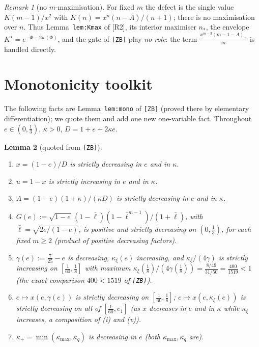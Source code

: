 \documentclass[11pt]{article}
\newtheorem{lemma}{Lemma}[section]
\theoremstyle{remark}
\newtheorem{remark}[lemma]{Remark}
\newcommand{\kxi}{\kappa_\xi}
\newcommand{\kq}{\kappa_q}
\newcommand{\kmx}{\kappa_{\max}}
\newcommand{\khi}{\kappa_{+}}
\newcommand{\lbar}{\bar\ell}
\newcommand{\RII}{[R2]}
\begin{document}
\begin{remark}[no $m$-maximisation]\label{zb9:rmk:noKmax}
For fixed $m$ the defect is the single value $K(m-1)/x^2$ with
$K(n)=x^n(n-A)/(n+1)$; there is no maximisation over $n$.  Thus
Lemma~\texttt{lem:Kmax} of \RII, its interior maximiser $n_*$, the envelope
$K^\star=e^{-\Phi-2w(\Phi)}$, and the gate of \texttt{[ZB]} play \emph{no
role}: the term $\tfrac{x^{m-3}(m-1-A)_+}{m}$ is handled directly.
\end{remark}

\section{Monotonicity toolkit}\label{zb9:sec:mono}

The following facts are Lemma~\texttt{lem:mono} of \texttt{[ZB]} (proved
there by elementary differentiation); we quote them and add one new
one-variable fact.  Throughout $e\in(0,\tfrac13)$, $\kappa>0$, $D=1+e+2\kappa e$.

\begin{lemma}[quoted from \texttt{[ZB]}]\label{zb9:mono}
\begin{enumerate}[label=\textup{(\roman*)},itemsep=1pt]
\item $x=(1-e)/D$ is strictly decreasing in $e$ and in $\kappa$.
\item $u=1-x$ is strictly increasing in $e$ and in $\kappa$.
\item $A=(1-e)(1+\kappa)/(\kappa D)$ is strictly decreasing in $e$ and in
$\kappa$.
\item $G(e):=\sqrt{1-e}\,(1-\lbar)(1-\lbar^{m-1})/(1+\lbar)$, with
$\lbar=\sqrt{2e/(1-e)}$, is positive and strictly decreasing on
$(0,\tfrac13)$, for each fixed $m\ge2$ (product of positive decreasing
factors).
\item $\gamma(e):=\tfrac7{25}-e$ is decreasing, $\kxi(e)$ increasing, and
$\kxi/(4\gamma)$ is strictly increasing on $[\tfrac1{60},\tfrac18]$ with
maximum $\kxi(\tfrac18)/(4\gamma(\tfrac18))=\tfrac{8/49}{31/50}=\tfrac{400}{1519}<1$
(the exact comparison $400<1519$ of \texttt{[ZB]}).
\item $e\mapsto x(e,\gamma(e))$ is strictly decreasing on
$[\tfrac1{60},\tfrac18]$; $e\mapsto x(e,\kxi(e))$ is strictly decreasing on
all of $[\tfrac1{60},e_1]$ (as $x$ decreases in $e$ and in $\kappa$
while $\kxi$ increases, a composition of (i) and (v)).
\item $\khi=\min(\kmx,\kq)$ is decreasing in $e$ (both $\kmx,\kq$ are).
\end{enumerate}
\end{lemma}
\end{document}
